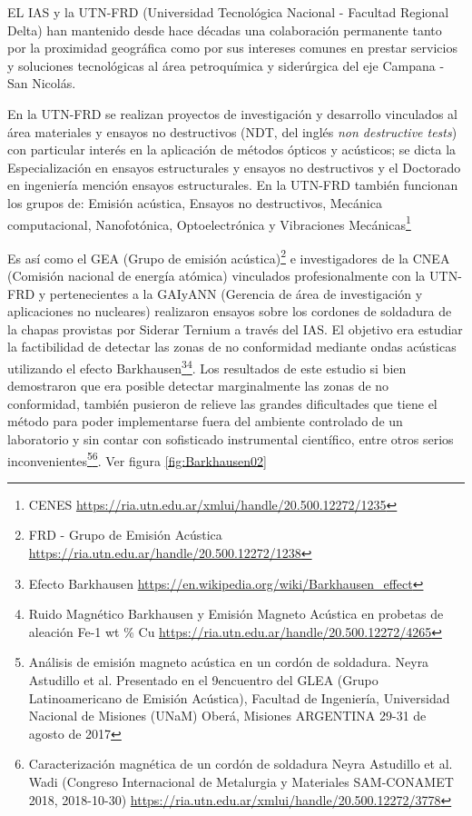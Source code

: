 EL IAS y la UTN-FRD (Universidad Tecnológica Nacional - Facultad Regional Delta) han mantenido desde hace décadas una colaboración permanente tanto por la proximidad geográfica como por sus intereses comunes en prestar servicios y soluciones tecnológicas al área petroquímica y siderúrgica del eje Campana - San Nicolás. 

En la UTN-FRD se realizan proyectos de investigación y desarrollo vinculados al área materiales y ensayos no destructivos (NDT, del inglés \textit{non destructive tests}) con particular interés en la aplicación de métodos ópticos y acústicos; se dicta la Especialización en ensayos estructurales y ensayos no destructivos y el Doctorado en ingeniería mención ensayos estructurales. En la UTN-FRD también funcionan los grupos de: Emisión acústica, Ensayos no destructivos, Mecánica computacional, Nanofotónica, Optoelectrónica y Vibraciones Mecánicas\footnote{CENES \url{https://ria.utn.edu.ar/xmlui/handle/20.500.12272/1235}}

Es así como el GEA (Grupo de emisión acústica)\footnote{FRD - Grupo de Emisión Acústica \url{https://ria.utn.edu.ar/handle/20.500.12272/1238}} e investigadores de la CNEA (Comisión nacional de energía atómica) vinculados profesionalmente con la UTN-FRD y pertenecientes a la GAIyANN (Gerencia de área de investigación y aplicaciones no nucleares) realizaron ensayos sobre los cordones de soldadura de la chapas provistas por Siderar Ternium a través del IAS. El objetivo era estudiar la factibilidad de detectar las zonas de no conformidad mediante ondas acústicas utilizando el efecto Barkhausen\footnote{Efecto Barkhausen \url{https://en.wikipedia.org/wiki/Barkhausen\_effect}}\footnote{Ruido Magnético Barkhausen y Emisión Magneto Acústica en probetas de aleación Fe-1 wt \% Cu \url{https://ria.utn.edu.ar/handle/20.500.12272/4265}}. Los resultados de este estudio si bien demostraron que era posible detectar marginalmente las zonas de no conformidad, también pusieron de relieve las grandes dificultades que tiene el método para poder implementarse fuera del ambiente controlado de un laboratorio y sin contar con sofisticado instrumental científico, entre otros serios inconvenientes\footnote{Análisis de emisión magneto acústica en un cordón de soldadura. Neyra Astudillo et al. Presentado en el 9\grados encuentro del GLEA (Grupo Latinoamericano de Emisión Acústica), Facultad de Ingeniería, Universidad Nacional de Misiones (UNaM) Oberá, Misiones ARGENTINA 29-31 de agosto de 2017}\footnote{Caracterización magnética de un cordón de soldadura Neyra Astudillo et al. Wadi (Congreso Internacional de Metalurgia y Materiales SAM-CONAMET 2018, 2018-10-30) \url{https://ria.utn.edu.ar/xmlui/handle/20.500.12272/3778}}. Ver figura \ref{fig:Barkhausen02}

